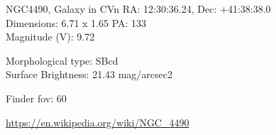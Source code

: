 \begin{block}{NGC4490, Galaxy in CVn}
    RA: 12:30:36.24, Dec: +41:38:38.0 \\ 
    Dimensions: 6.71 x 1.65 PA: 133 \\ 
    Magnitude (V): 9.72

    Morphological type: SBcd \\ 
    Surface Brightness: 21.43 mag/arcsec2 


    Finder fov: 60 

    \url{https://en.wikipedia.org/wiki/NGC_4490} 
\end{block}
